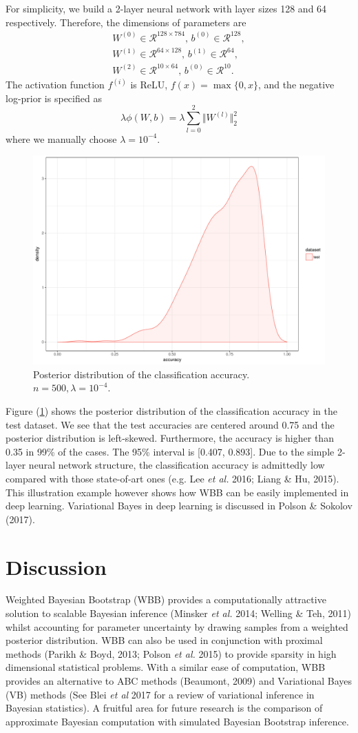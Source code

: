 \documentclass[12pt]{TD-CJS}
\newcommand{\R}{\mathcal{R}}
\begin{document}
For simplicity, we build a 2-layer neural network with layer sizes 128 and 64 respectively. Therefore, the dimensions of parameters are
\begin{align*}
W^{(0)} \in \R^{128\times 784},\, b^{(0)}\in \R^{128},\\
W^{(1)} \in \R^{64\times 128},\, b^{(1)}\in \R^{64},\\
W^{(2)} \in \R^{10\times 64},\, b^{(0)}\in \R^{10}.
\end{align*}
The activation function $f^{(i)}$ is ReLU, $f(x) = \max\{0,x\}$, and the negative log-prior is specified as 
$$
\lambda\phi(W,b) = \lambda\sum_{l=0}^{2}\Vert W^{(l)} \Vert_2^2
$$
where we manually choose $\lambda = 10^{-4}$. 
\begin{figure}[!ht]
	\centering
	\includegraphics[width=0.7\linewidth]{acc}
	\caption{Posterior distribution of the classification accuracy. $n=500, \lambda=10^{-4}$.}
	\label{fig:acc}
\end{figure}
Figure (\ref{fig:acc}) shows the posterior distribution of the classification accuracy in the test dataset. We see that the test accuracies are centered around 0.75 and the posterior distribution is left-skewed. Furthermore, the accuracy is higher than 0.35 in 99\% of the cases. The 95\% interval is [0.407, 0.893].  Due to the simple 2-layer neural network structure, the classification accuracy is admittedly low compared with those state-of-art ones (e.g. Lee {\em et al.} 2016; Liang \& Hu,  2015). This illustration example however shows how WBB can be easily implemented in deep learning. Variational Bayes in deep learning is discussed in Polson \& Sokolov (2017).

\section{Discussion}
Weighted Bayesian Bootstrap (WBB) provides a computationally attractive solution to scalable Bayesian inference (Minsker {\em et al.} 2014; Welling \& Teh, 2011)
whilst accounting for parameter uncertainty by drawing  samples from a weighted posterior distribution. WBB can also be used in conjunction with proximal methods (Parikh \& Boyd, 2013; Polson {\em et al.} 
 2015)
to provide  sparsity in high dimensional statistical problems. With a similar ease of computation, WBB provides an alternative to ABC methods (Beaumont, 2009) and Variational Bayes (VB) methods (See Blei {\em et al} 2017 for a review of variational inference in Bayesian statistics). A fruitful area for future research is the comparison of approximate Bayesian computation with simulated Bayesian Bootstrap inference.
\end{document}

